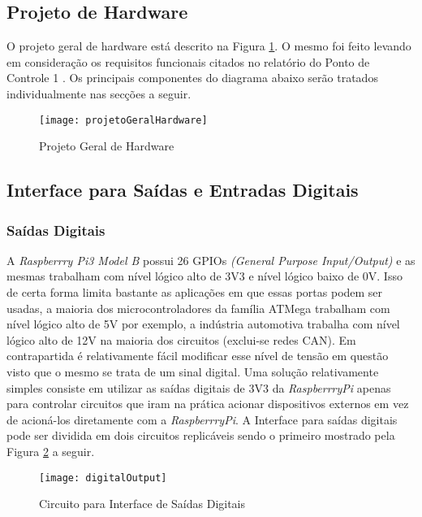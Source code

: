 \subsection{Projeto de Hardware}

O projeto geral de hardware está descrito na Figura \ref{fig-projetoGeralHardware}. O mesmo foi feito levando em consideração os requisitos funcionais citados no relatório do Ponto de Controle 1 \cite{relPC1}.  Os principais componentes do diagrama abaixo serão tratados individualmente nas secções a seguir.

\begin{figure}[htbp]
	\centering
		\texttt{[image: projetoGeralHardware]}
	\caption{Projeto Geral de Hardware}
	\label{fig-projetoGeralHardware}
\end{figure}


\subsection{Interface para Saídas e Entradas Digitais}

	\subsubsection{Saídas Digitais}
		A \textit{Raspberrry Pi3 Model B} possui 26 GPIOs \textit{(General Purpose Input/Output)} e as mesmas trabalham com nível lógico alto de 3V3 e nível lógico baixo de 0V. Isso de certa forma limita bastante as aplicações em que essas portas podem ser usadas, a maioria dos microcontroladores da família ATMega trabalham com nível lógico alto de 5V por exemplo, a indústria automotiva trabalha com nível lógico alto de 12V na maioria dos circuitos (exclui-se redes CAN). Em contrapartida é relativamente fácil modificar esse nível de tensão em questão visto que o mesmo se trata de um sinal digital. Uma solução relativamente simples consiste em utilizar as saídas digitais de 3V3 da \textit{RaspberrryPi} apenas para controlar circuitos que iram na prática acionar dispositivos externos em vez de acioná-los diretamente com a \textit{RaspberrryPi}. A Interface para saídas digitais pode ser dividida em dois circuitos replicáveis sendo o primeiro mostrado pela Figura \ref{fig-digitalOutput} a seguir.
		
		\begin{figure}[htbp]
			\centering
				\texttt{[image: digitalOutput]}
			\caption{Circuito para Interface de Saídas Digitais}
			\label{fig-digitalOutput}
		\end{figure}

